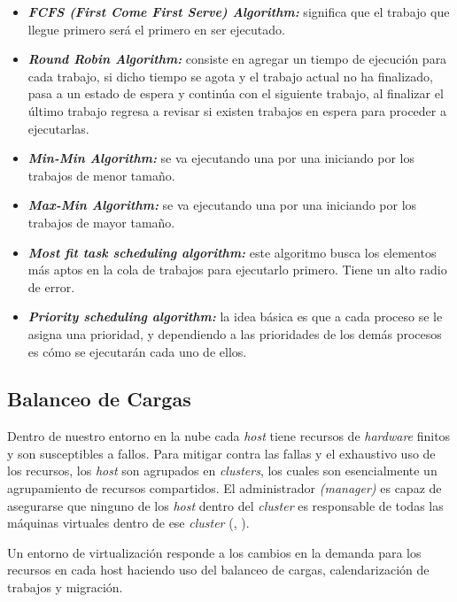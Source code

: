 \begin{itemize}
	\item \textit{\textbf{FCFS (First Come First Serve) Algorithm:}} significa que el trabajo que llegue primero ser\'a el primero en ser ejecutado.
	\item \textit{\textbf{Round Robin Algorithm:}} consiste en agregar un tiempo de ejecuci\'on para cada trabajo, si dicho tiempo se agota y el trabajo actual no ha finalizado, pasa a un estado de espera y contin\'ua con el siguiente trabajo, al finalizar el \'ultimo trabajo regresa a revisar si existen trabajos en espera para proceder a ejecutarlas. 
	\item  \textit{\textbf{Min-Min Algorithm:}} se va ejecutando una por una iniciando por los trabajos de menor tama\~no.
	\item  \textit{\textbf{Max-Min Algorithm:}} se va ejecutando una por una iniciando por los trabajos de mayor tama\~no.
	\item  \textit{\textbf{Most fit task scheduling algorithm:}} este algoritmo busca los elementos m\'as aptos en la cola de trabajos para ejecutarlo primero. Tiene un alto radio de error.
	\item \textit{\textbf{Priority scheduling algorithm:}} la idea b\'asica es que a cada proceso se le asigna una prioridad, y dependiendo a las prioridades de los dem\'as procesos es c\'omo se ejecutar\'an cada uno de ellos.
\end{itemize}

\subsection*{Balanceo de Cargas}

Dentro de nuestro entorno en la nube cada \textit{host} tiene recursos de \textit{hardware} finitos y son susceptibles a fallos. Para mitigar contra las fallas y el exhaustivo uso de los recursos, los \textit{host} son agrupados en \textit{clusters}, los cuales son esencialmente un agrupamiento de recursos compartidos. El administrador \textit{(manager)} es capaz de asegurarse que ninguno de los \textit{host} dentro del \textit{cluster} es responsable de todas las m\'aquinas virtuales dentro de ese \textit{cluster} (\citeauthor{redhat}, \citeyear{redhat}).

Un entorno de virtualizaci\'on responde a los cambios en la demanda para los recursos en cada host haciendo uso del balanceo de cargas, calendarizaci\'on de trabajos y migraci\'on.

